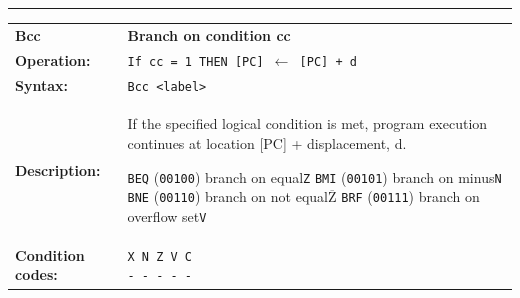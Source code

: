 \documentclass[]{article}
\newcommand{\textoverline}[1]{$\overline{\mbox{#1}}$}
\begin{document}
\begin{appendices}
\noindent\rule{\textwidth}{1pt}\newline %
\setlength\extrarowheight{5pt} %
\begin{tabularx}{\textwidth}{lL}
  {\Large \textbf{Bcc}} 	& {\Large \textbf{Branch on condition cc}}\\
  \textbf{Operation:} 		& \texttt{If cc = 1 THEN [PC] $\leftarrow$ [PC] + d}\\
  \textbf{Syntax:}  		& \texttt{Bcc <label>}\\
  \textbf{Description:}  	& If the specified logical condition is met, program execution
continues at location [PC] + displacement, d.\newline

\texttt{BEQ} (\texttt{00100}) {} {} branch on equal\hfill \texttt{Z}\newline
\texttt{BMI} (\texttt{00101}) {} {} branch on minus\hfill \texttt{N}\newline
\texttt{BNE} (\texttt{00110}) {} {} branch on not equal\hfill \texttt{\textoverline{Z}}\newline
\texttt{BRF} (\texttt{00111}) {} {} branch on overflow set\hfill \texttt{V}\newline
							  \\
  \textbf{Condition codes:} & \texttt{X N Z V C\newline - - - - -}\\
\end{tabularx}
\newline

\newpage


\end{appendices}
\end{document}
